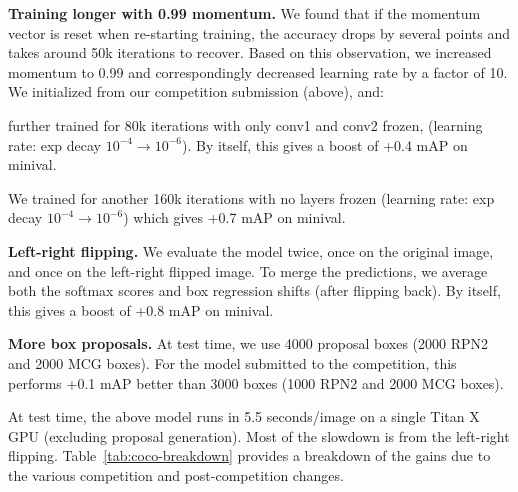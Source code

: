 \documentclass[10pt,twocolumn,letterpaper]{article}
\begin{document}
\begin{packed_enum}
  \item \textbf{Training longer with 0.99 momentum.}  We found that if the
    momentum vector is reset when re-starting training, the accuracy drops by
    several points and takes around 50k iterations to recover.  Based on this
    observation, we increased momentum to 0.99 and correspondingly decreased
    learning rate by a factor of 10.  We initialized from our competition
    submission (above), and:
    \begin{packed_enum}
      \item further trained for
      80k iterations with only conv1 and conv2 frozen, (learning rate: exp decay
      $10^{-4} \rightarrow 10^{-6}$).
      By itself, this gives a boost of +0.4 mAP on minival.
    \item We trained for another 160k iterations with no layers frozen (learning
      rate: exp decay $10^{-4} \rightarrow 10^{-6}$) which gives +0.7 mAP on
      minival.
  \end{packed_enum}
  \item \textbf{Left-right flipping.}  We evaluate the model twice, once on the
    original image, and once on the left-right flipped image.  To merge the
    predictions, we average both the softmax scores and box regression shifts
    (after flipping back).  By itself, this gives a boost of +0.8 mAP on minival.
  \item \textbf{More box proposals.} At test time, we use 4000 proposal boxes
    (2000 RPN2 and 2000 MCG boxes).  For the model submitted to the competition,
    this performs +0.1 mAP better than 3000 boxes (1000 RPN2 and 2000 MCG
    boxes).
\end{packed_enum}
At test time, the above model runs in 5.5 seconds/image on a single Titan X GPU
(excluding proposal generation).  Most of the slowdown is from the left-right
flipping. Table~\ref{tab:coco-breakdown} provides a breakdown of the gains due
to the various competition and post-competition changes.
\end{document}
